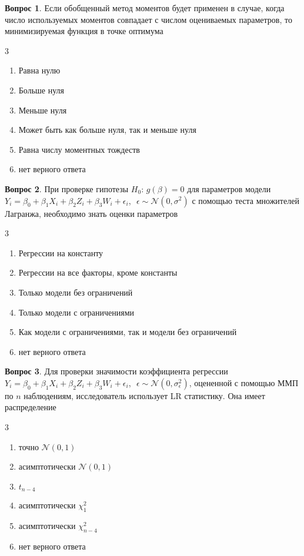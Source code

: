 \documentclass[12pt]{article}
\def \cN{\mathcal{N}}
\newenvironment{answerlist}[1][3]{
\begin{multicols}{#1}
\begin{enumerate}[label=\fbox{\emph{\Alph*}},ref=\emph{\alph*}]
}
{
\end{enumerate}
\end{multicols}
}
\theoremstyle{definition}
\newtheorem{question}{Вопрос}
\begin{document}
\begin{question}
  Если обобщенный метод моментов будет применен в случае, когда число используемых моментов 
  совпадает с числом оцениваемых параметров, то минимизируемая функция в точке оптимума 
\begin{answerlist}
\item Равна нулю
\item Больше нуля
\item Меньше нуля
\item Может быть как больше нуля, так и меньше нуля
\item Равна числу моментных тождеств
\item нет верного ответа
\end{answerlist}
\end{question}



\begin{question}
При проверке гипотезы \( H_0\): \(g(\beta)=0 \) 
для параметров модели \( Y_i=\beta_0+\beta_1 X_{i} + \beta_2 Z_i + \beta_3 W_i + \epsilon_i\), 
\(\epsilon \sim \cN(0,\sigma^2) \) 
с помощью теста множителей Лагранжа, необходимо знать оценки параметров
  \begin{answerlist}
  \item Регрессии на константу   
  \item Регрессии на все факторы, кроме константы   
  \item Только модели без ограничений
  \item Только модели с ограничениями
  \item Как модели с ограничениями, так и модели без ограничений 
  \item нет верного ответа
\end{answerlist}
  \end{question}

  
  \begin{question}
  Для проверки значимости коэффициента регрессии \( Y_i=\beta_0+\beta_1 X_{i} + \beta_2 Z_i + \beta_3 W_i + \epsilon_i\), 
  \(\epsilon \sim \cN(0,\sigma_\epsilon^2) \), 
  оцененной с помощью ММП по \( n \) наблюдениям, 
  исследователь использует LR статистику. Она имеет распределение
    \begin{answerlist}
    \item точно \( \cN(0, 1) \)
    \item асимптотически \( \cN(0, 1) \)
    \item $t_{n-4}$
    \item асимптотически $\chi^2_{1}$
    \item асимптотически $\chi^2_{n-4}$
    \item нет верного ответа
    \end{answerlist}
    \end{question}
    
\end{document}
